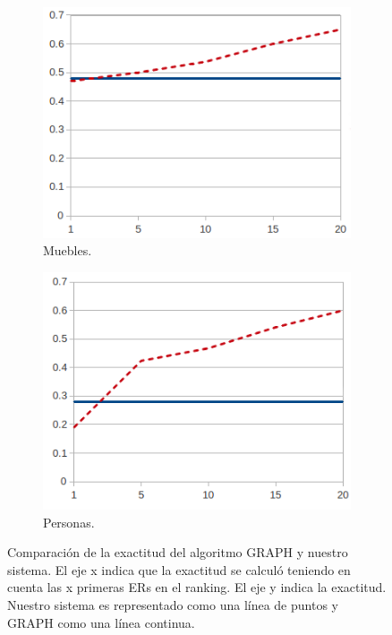 \begin{figure}[h]
\begin{subfigure}{.5\textwidth}
  \centering
\includegraphics[width=\textwidth]{images/furniturePrec.png}
\caption{Muebles.}
\label{Tuna-scene-prec}

\end{subfigure}
\begin{subfigure}{.5\textwidth}
 \centering
  \centering
\includegraphics[width=\textwidth]{images/precP.png}
\caption{Personas.}
\end{subfigure}
\caption{Comparaci\'on de la exactitud  del algoritmo GRAPH y nuestro sistema. El eje x indica que la exactitud se calcul\'o teniendo en cuenta las x primeras ERs en el ranking. El eje y indica la exactitud. Nuestro sistema es representado como una l\'inea de puntos y GRAPH como una l\'inea continua.\label{graficoPresicion}}

\end{figure}


